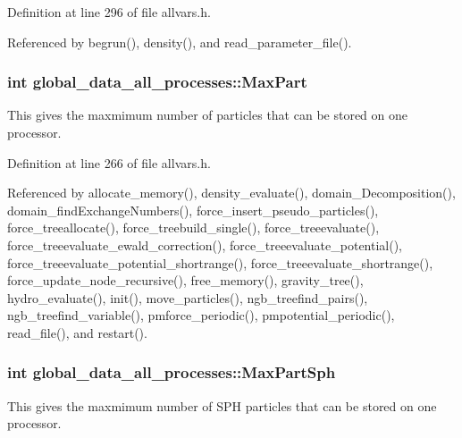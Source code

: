 Definition at line 296 of file allvars.h.



Referenced by begrun(), density(), and read\_\-parameter\_\-file().

\hypertarget{structglobal__data__all__processes_a413b30e91ae833d0c78b42744a99e67f}{
\subsubsection[{MaxPart}]{\setlength{\rightskip}{0pt plus 5cm}int {\bf global\_\-data\_\-all\_\-processes::MaxPart}}}
\label{structglobal__data__all__processes_a413b30e91ae833d0c78b42744a99e67f}
This gives the maxmimum number of particles that can be stored on one processor. 

Definition at line 266 of file allvars.h.



Referenced by allocate\_\-memory(), density\_\-evaluate(), domain\_\-Decomposition(), domain\_\-findExchangeNumbers(), force\_\-insert\_\-pseudo\_\-particles(), force\_\-treeallocate(), force\_\-treebuild\_\-single(), force\_\-treeevaluate(), force\_\-treeevaluate\_\-ewald\_\-correction(), force\_\-treeevaluate\_\-potential(), force\_\-treeevaluate\_\-potential\_\-shortrange(), force\_\-treeevaluate\_\-shortrange(), force\_\-update\_\-node\_\-recursive(), free\_\-memory(), gravity\_\-tree(), hydro\_\-evaluate(), init(), move\_\-particles(), ngb\_\-treefind\_\-pairs(), ngb\_\-treefind\_\-variable(), pmforce\_\-periodic(), pmpotential\_\-periodic(), read\_\-file(), and restart().

\hypertarget{structglobal__data__all__processes_a43dccd3997af759d43a2f3bcce44a2c4}{
\subsubsection[{MaxPartSph}]{\setlength{\rightskip}{0pt plus 5cm}int {\bf global\_\-data\_\-all\_\-processes::MaxPartSph}}}
\label{structglobal__data__all__processes_a43dccd3997af759d43a2f3bcce44a2c4}
This gives the maxmimum number of SPH particles that can be stored on one processor. 

